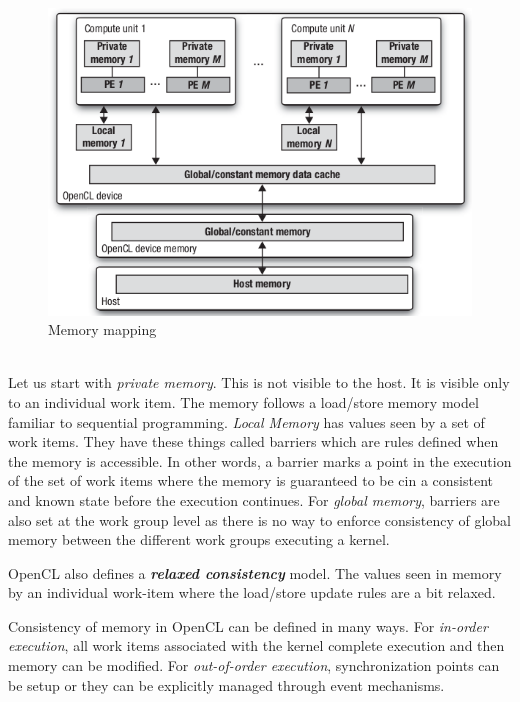 \begin{figure}[H]
  \centering
  \includegraphics[scale=0.8]{./images/memory_mapping.png}
  \caption{Memory mapping}
	\label{}
\end{figure}

{\color{red} \date{02-June-2020}} \\
Let us start with \textit{private memory}. This is not visible to the host. It is visible only to an individual work item. The memory follows a load/store memory model familiar to sequential programming. \textit{Local Memory} has values seen by a set of work items. They have these things called barriers which are rules defined when the memory is accessible. In other words, a barrier marks a point in the execution of the set of work items where the memory is guaranteed to be cin a consistent and known state before the execution continues. For \textit{global memory}, barriers are also set at the work group level as there is no way to enforce consistency of global memory between the different work groups executing a kernel.

OpenCL also defines a \textit{\textbf{relaxed consistency}} model. The values seen in memory by an individual work-item where the load/store update rules are a bit relaxed.

Consistency of memory in OpenCL can be defined in many ways. For \textit{in-order execution}, all work items associated with the kernel complete execution and then memory can be modified. For \textit{out-of-order execution}, synchronization points can be setup or they can be explicitly managed through event mechanisms.

